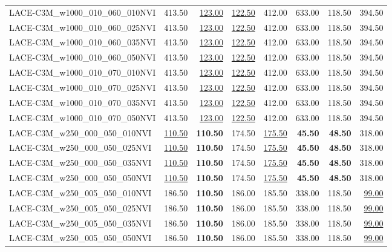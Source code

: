 \begin{table}
\begin{tabular}{lrrrrrrr}
LACE-C3M\_w1000\_010\_060\_010NVI & 413.50 & \underline{123.00} & \underline{122.50} & 412.00 & 633.00 & 118.50 & 394.50 \\
LACE-C3M\_w1000\_010\_060\_025NVI & 413.50 & \underline{123.00} & \underline{122.50} & 412.00 & 633.00 & 118.50 & 394.50 \\
LACE-C3M\_w1000\_010\_060\_035NVI & 413.50 & \underline{123.00} & \underline{122.50} & 412.00 & 633.00 & 118.50 & 394.50 \\
LACE-C3M\_w1000\_010\_060\_050NVI & 413.50 & \underline{123.00} & \underline{122.50} & 412.00 & 633.00 & 118.50 & 394.50 \\
LACE-C3M\_w1000\_010\_070\_010NVI & 413.50 & \underline{123.00} & \underline{122.50} & 412.00 & 633.00 & 118.50 & 394.50 \\
LACE-C3M\_w1000\_010\_070\_025NVI & 413.50 & \underline{123.00} & \underline{122.50} & 412.00 & 633.00 & 118.50 & 394.50 \\
LACE-C3M\_w1000\_010\_070\_035NVI & 413.50 & \underline{123.00} & \underline{122.50} & 412.00 & 633.00 & 118.50 & 394.50 \\
LACE-C3M\_w1000\_010\_070\_050NVI & 413.50 & \underline{123.00} & \underline{122.50} & 412.00 & 633.00 & 118.50 & 394.50 \\
LACE-C3M\_w250\_000\_050\_010NVI & \underline{110.50} & \textbf{110.50} & 174.50 & \underline{175.50} & \textbf{45.50} & \textbf{48.50} & 318.00 \\
LACE-C3M\_w250\_000\_050\_025NVI & \underline{110.50} & \textbf{110.50} & 174.50 & \underline{175.50} & \textbf{45.50} & \textbf{48.50} & 318.00 \\
LACE-C3M\_w250\_000\_050\_035NVI & \underline{110.50} & \textbf{110.50} & 174.50 & \underline{175.50} & \textbf{45.50} & \textbf{48.50} & 318.00 \\
LACE-C3M\_w250\_000\_050\_050NVI & \underline{110.50} & \textbf{110.50} & 174.50 & \underline{175.50} & \textbf{45.50} & \textbf{48.50} & 318.00 \\
LACE-C3M\_w250\_005\_050\_010NVI & 186.50 & \textbf{110.50} & 186.00 & 185.50 & 338.00 & 118.50 & \underline{99.00} \\
LACE-C3M\_w250\_005\_050\_025NVI & 186.50 & \textbf{110.50} & 186.00 & 185.50 & 338.00 & 118.50 & \underline{99.00} \\
LACE-C3M\_w250\_005\_050\_035NVI & 186.50 & \textbf{110.50} & 186.00 & 185.50 & 338.00 & 118.50 & \underline{99.00} \\
LACE-C3M\_w250\_005\_050\_050NVI & 186.50 & \textbf{110.50} & 186.00 & 185.50 & 338.00 & 118.50 & \underline{99.00} \\

\end{tabular}
\end{table}
